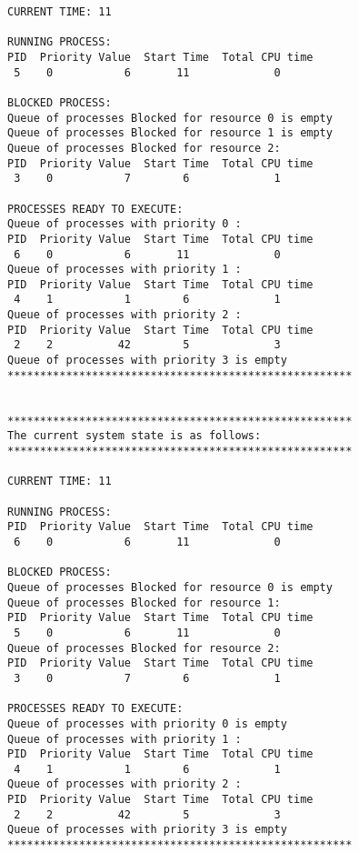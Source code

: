 \begin{verbatim}
CURRENT TIME: 11

RUNNING PROCESS:
PID  Priority Value  Start Time  Total CPU time
 5    0           6       11             0

BLOCKED PROCESS:
Queue of processes Blocked for resource 0 is empty
Queue of processes Blocked for resource 1 is empty
Queue of processes Blocked for resource 2:
PID  Priority Value  Start Time  Total CPU time
 3    0           7        6             1

PROCESSES READY TO EXECUTE:
Queue of processes with priority 0 :
PID  Priority Value  Start Time  Total CPU time
 6    0           6       11             0
Queue of processes with priority 1 :
PID  Priority Value  Start Time  Total CPU time
 4    1           1        6             1
Queue of processes with priority 2 :
PID  Priority Value  Start Time  Total CPU time
 2    2          42        5             3
Queue of processes with priority 3 is empty
*****************************************************


*****************************************************
The current system state is as follows:
*****************************************************

CURRENT TIME: 11

RUNNING PROCESS:
PID  Priority Value  Start Time  Total CPU time
 6    0           6       11             0

BLOCKED PROCESS:
Queue of processes Blocked for resource 0 is empty
Queue of processes Blocked for resource 1:
PID  Priority Value  Start Time  Total CPU time
 5    0           6       11             0
Queue of processes Blocked for resource 2:
PID  Priority Value  Start Time  Total CPU time
 3    0           7        6             1

PROCESSES READY TO EXECUTE:
Queue of processes with priority 0 is empty
Queue of processes with priority 1 :
PID  Priority Value  Start Time  Total CPU time
 4    1           1        6             1
Queue of processes with priority 2 :
PID  Priority Value  Start Time  Total CPU time
 2    2          42        5             3
Queue of processes with priority 3 is empty
*****************************************************
\end{verbatim}
\newpage
